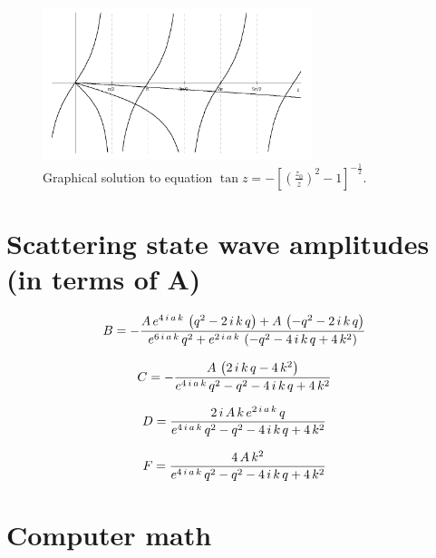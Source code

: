 \documentclass[a4paper,12pt]{article}
\begin{document}
\begin{figure}[!htb]
  \centering
  \includegraphics[width=0.7\textwidth]{odd_states.png}
  \caption{Graphical solution to equation $\tan{z}=-[(\frac{z_0}{z})^2-1]^{-\frac{1}{2}}$.}
\end{figure}

\section*{Scattering state wave amplitudes (in terms of A)}

$$B=-{{A\,e^{4\,i\,a\,k}\,\left(q^2-2\,i\,k\,q\right)+A\,\left(-q^2-2
 \,i\,k\,q\right)}\over{e^{6\,i\,a\,k}\,q^2+e^{2\,i\,a\,k}\,\left(-q^
 2-4\,i\,k\,q+4\,k^2\right)}}$$

$$C=-{{A\,\left(2\,i\,k\,q-4\,k^2\right)}\over{e^{4\,i\,a\,k}\,q^2-q^
 2-4\,i\,k\,q+4\,k^2}}$$

$$D={{2\,i\,A\,k\,e^{2\,i\,a\,k}\,q}\over{e^{4\,i\,a\,k}\,q^2-q^2-4\,
 i\,k\,q+4\,k^2}}$$

$$F={{4\,A\,k^2}\over{e^{4\,i\,a\,k}\,q^2-q^2-4\,i\,k\,q+4\,k^2}}$$

\section*{Computer math}


\end{document}
